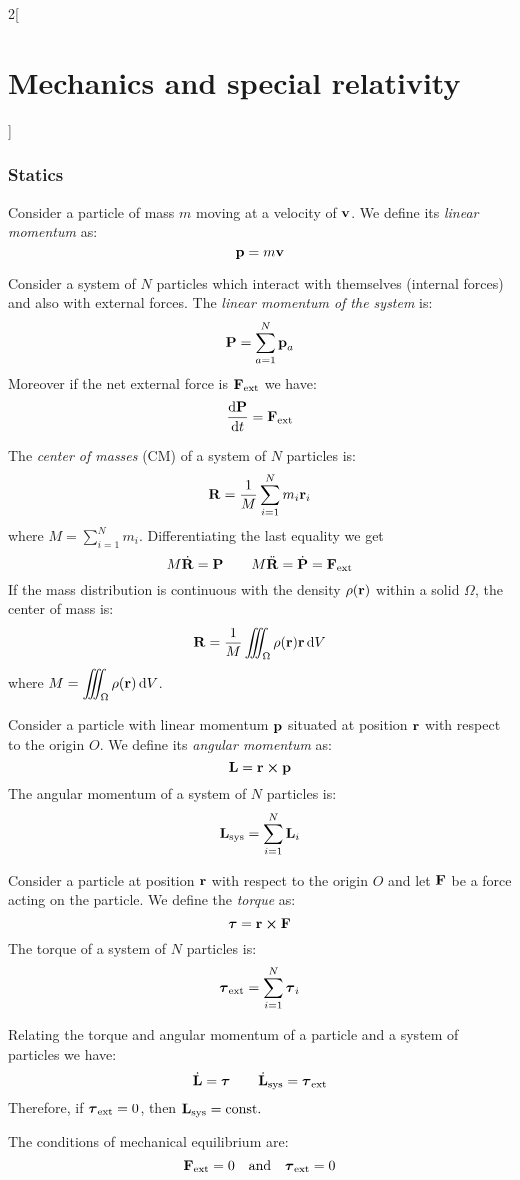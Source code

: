\documentclass[../../../main_physics.tex]{subfiles}
\begin{document}
\begin{multicols}{2}[\section{Mechanics and special relativity}]
  \subsubsection{Statics}
  \begin{definition}
    Consider a particle of mass $m$ moving at a velocity of $\boldsymbol{\mathrm{v}}$. We define its \emph{linear momentum} as:
    $$\boldsymbol{\mathrm{p}}=m\boldsymbol{\mathrm{v}}$$
  \end{definition}
  \begin{proposition}
    Consider a system of $N$ particles which interact with themselves (internal forces) and also with external forces. The \emph{linear momentum of the system} is: $$\boldsymbol{\mathrm{P}}=\sum_{a=1}^N\boldsymbol{\mathrm{p}}_a$$ Moreover if the net external force is $\boldsymbol{\mathrm{F}}_\text{ext}$ we have:
    $$\dv{\boldsymbol{\mathrm{P}}}{t}=\boldsymbol{\mathrm{F}}_\text{ext}$$
  \end{proposition}
  \begin{proposition}
    The \emph{center of masses} (CM) of a system of $N$ particles is: $$\boldsymbol{\mathrm{R}}=\frac{1}{M}\sum_{i=1}^Nm_i\boldsymbol{\mathrm{r}}_i$$ where $\displaystyle M=\sum_{i=1}^Nm_i$. Differentiating the last equality we get
    $$M\dot{\boldsymbol{\mathrm{R}}}=\boldsymbol{\mathrm{P}}\qquad M\ddot{\boldsymbol{\mathrm{R}}}=\dot{\boldsymbol{\mathrm{P}}}=\boldsymbol{\mathrm{F}}_\text{ext}$$
    If the mass distribution is continuous with the density $\rho(\boldsymbol{\mathrm{r}})$ within a solid $\Omega$, the center of mass is: $$\boldsymbol{\mathrm{R}}=\frac{1}{M}\iiint_\Omega\rho(\boldsymbol{\mathrm{r}})\boldsymbol{\mathrm{r}}\dd{V}$$ where $\displaystyle M=\iiint_\Omega\rho(\boldsymbol{\mathrm{r}})\dd{V}$.
  \end{proposition}
  \begin{proposition}
    Consider a particle with linear momentum $\boldsymbol{\mathrm{p}}$ situated at position $\boldsymbol{\mathrm{r}}$ with respect to the origin $O$. We define its \emph{angular momentum} as: $$\vf{L}=\vf{r}\crossprod\vf{p}$$ The angular momentum of a system of $N$ particles is: $$\boldsymbol{\mathrm{L}}_\text{sys}=\sum_{i=1}^N\boldsymbol{\mathrm{L}}_i$$
  \end{proposition}
  \begin{proposition}[Torque]
    Consider a particle at position $\boldsymbol{\mathrm{r}}$ with respect to the origin $O$ and let $\boldsymbol{\mathrm{F}}$ be a force acting on the particle. We define the \emph{torque} as: $$\vf{\tau}=\vf{r}\crossprod\vf{F}$$ The torque of a system of $N$ particles is: $$\boldsymbol{\mathrm{\tau}}_\text{ext}=\sum_{i=1}^N\boldsymbol{\mathrm{\tau}}_i$$
  \end{proposition}
  \begin{proposition}
    Relating the torque and angular momentum of a particle and a system of particles we have:
    $$\dot{\boldsymbol{\mathrm{L}}}=\boldsymbol{\mathrm{\tau}}\qquad\dot{\boldsymbol{\mathrm{L}}}_\text{sys}=\boldsymbol{\mathrm{\tau}}_\text{ext}$$ Therefore, if $\boldsymbol{\mathrm{\tau}}_\text{ext}=0$, then $\boldsymbol{\mathrm{L}}_\text{sys}=\text{const}.$
  \end{proposition}
  \begin{definition}
    The conditions of mechanical equilibrium are: $$\boldsymbol{\mathrm{F}}_\text{ext}=0\quad\text{and}\quad\boldsymbol{\mathrm{\tau}}_\text{ext}=0$$
  \end{definition}

\end{multicols}
\end{document}
